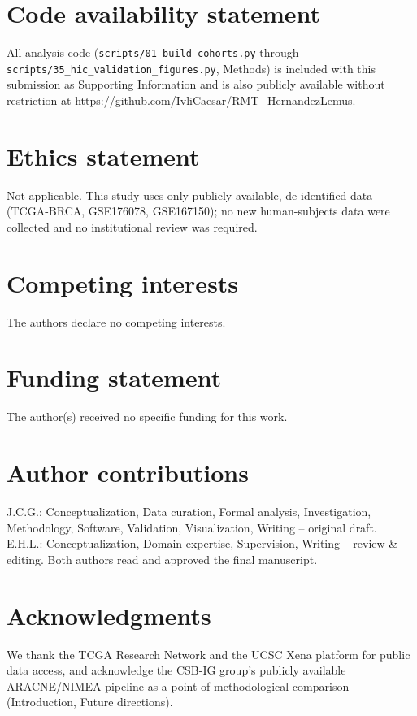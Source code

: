 \documentclass[11pt]{article}
\begin{document}
\section*{Code availability statement}
All analysis code (\texttt{scripts/01\_build\_cohorts.py} through
\texttt{scripts/35\_hic\_validation\_figures.py}, Methods) is included
with this submission as Supporting Information and is also publicly
available without restriction at
\url{https://github.com/IvliCaesar/RMT_HernandezLemus}.

\section*{Ethics statement}
Not applicable. This study uses only publicly available, de-identified
data (TCGA-BRCA, GSE176078, GSE167150); no new human-subjects data
were collected and no institutional review was required.

\section*{Competing interests}
The authors declare no competing interests.

\section*{Funding statement}
The author(s) received no specific funding for this work.

\section*{Author contributions}
J.C.G.: Conceptualization, Data curation, Formal analysis, Investigation,
Methodology, Software, Validation, Visualization, Writing -- original
draft. E.H.L.: Conceptualization, Domain expertise, Supervision,
Writing -- review \& editing. Both authors read and approved the final
manuscript.

\section*{Acknowledgments}
We thank the TCGA Research Network and the UCSC Xena platform for
public data access, and acknowledge the CSB-IG group's publicly
available ARACNE/NIMEA pipeline as a point of methodological
comparison (Introduction, Future directions).
\end{document}
